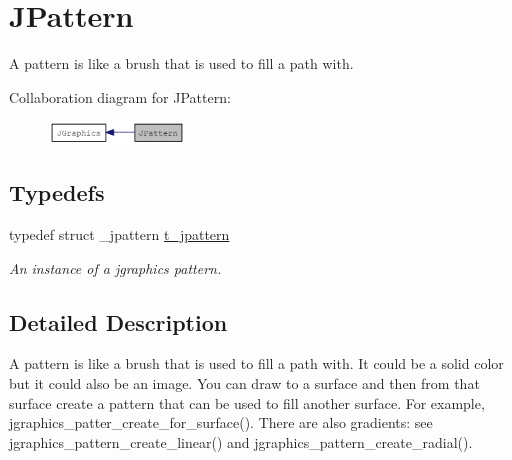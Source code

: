 \hypertarget{group__jpattern}{
\section{JPattern}
\label{group__jpattern}
}


A pattern is like a brush that is used to fill a path with.  


Collaboration diagram for JPattern:\nopagebreak
\begin{figure}[H]
\begin{center}
\leavevmode
\includegraphics[width=102pt]{group__jpattern}
\end{center}
\end{figure}
\subsection*{Typedefs}
\begin{DoxyCompactItemize}
\item 
\hypertarget{group__jpattern_ga09985abaac3992df8e5985e219191c7d}{
typedef struct \_\-jpattern \hyperlink{group__jpattern_ga09985abaac3992df8e5985e219191c7d}{t\_\-jpattern}}
\label{group__jpattern_ga09985abaac3992df8e5985e219191c7d}

\begin{DoxyCompactList}\small\item\em An instance of a jgraphics pattern. \item\end{DoxyCompactList}\end{DoxyCompactItemize}


\subsection{Detailed Description}
A pattern is like a brush that is used to fill a path with. It could be a solid color but it could also be an image. You can draw to a surface and then from that surface create a pattern that can be used to fill another surface. For example, jgraphics\_\-patter\_\-create\_\-for\_\-surface(). There are also gradients: see jgraphics\_\-pattern\_\-create\_\-linear() and jgraphics\_\-pattern\_\-create\_\-radial(). 